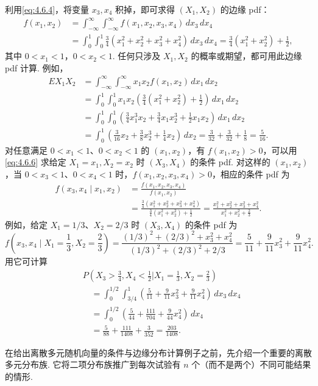 \begin{example}[多元 pdf]
利用\eqref{eq:4.6.4}，将变量 $x_3,x_4$ 积掉，即可求得 $(X_1,X_2)$ 的边缘 pdf：
$$\begin{aligned}
f(x_1,x_2)&=\int_{-\infty}^{\infty}\int_{-\infty}^{\infty}f(x_1,x_2,x_3,x_4)\,dx_3\,dx_4\\
&=\int_0^1\int_0^1\frac34(x_1^2+x_2^2+x_3^2+x_4^2)\,dx_3\,dx_4
=\frac34(x_1^2+x_2^2)+\frac12,
\end{aligned}$$
其中 $0<x_1<1$，$0<x_2<1$. 任何只涉及 $X_1,X_2$ 的概率或期望，都可用此边缘 pdf 计算. 例如，
$$\begin{aligned}
EX_1X_2&=\int_{-\infty}^{\infty}\int_{-\infty}^{\infty}x_1x_2 f(x_1,x_2)\,dx_1\,dx_2\\
&=\int_0^1\int_0^1x_1x_2\left(\frac34(x_1^2+x_2^2)+\frac12\right)\,dx_1\,dx_2\\
&=\int_0^1\int_0^1\left(\frac34x_1^3x_2+\frac34x_1x_2^3+\frac12x_1x_2\right)\,dx_1\,dx_2\\
&=\int_0^1\left(\frac3{16}x_2+\frac38x_2^3+\frac14x_2\right)\,dx_2
=\frac3{32}+\frac3{32}+\frac18=\frac5{16}.
\end{aligned}$$
对任意满足 $0<x_1<1$、$0<x_2<1$ 的 $(x_1,x_2)$，有 $f(x_1,x_2)>0$，可以用\eqref{eq:4.6.6} 求给定 $X_1=x_1,X_2=x_2$ 时 $(X_3,X_4)$ 的条件 pdf. 对这样的 $(x_1,x_2)$，当 $0<x_3<1$、$0<x_4<1$ 时，$f(x_1,x_2,x_3,x_4)>0$，相应的条件 pdf 为
$$\begin{aligned}
f(x_3,x_4\mid x_1,x_2)&=\frac{f(x_1,x_2,x_3,x_4)}{f(x_1,x_2)}\\
&=\frac{\frac34(x_1^2+x_2^2+x_3^2+x_4^2)}{\frac34(x_1^2+x_2^2)+\frac12}
=\frac{x_1^2+x_2^2+x_3^2+x_4^2}{x_1^2+x_2^2+\frac23}.
\end{aligned}$$
例如，给定 $X_1=1/3$、$X_2=2/3$ 时 $(X_3,X_4)$ 的条件 pdf 为
$$f\left(x_3,x_4\mid X_1=\frac13,X_2=\frac23\right)
=\frac{(1/3)^2+(2/3)^2+x_3^2+x_4^2}{(1/3)^2+(2/3)^2+2/3}
=\frac5{11}+\frac9{11}x_3^2+\frac9{11}x_4^2.$$
用它可计算
$$\begin{aligned}
&P\left(X_3>\frac34,X_4<\frac12\mathrel{\Big|}X_1=\frac13,X_2=\frac23\right)\\
&\quad=\int_0^{1/2}\int_{3/4}^1\left(\frac5{11}+\frac9{11}x_3^2+\frac9{11}x_4^2\right)\,dx_3\,dx_4\\
&\quad=\int_0^{1/2}\left(\frac5{44}+\frac{111}{704}+\frac9{44}x_4^2\right)\,dx_4\\
&\quad=\frac5{88}+\frac{111}{1408}+\frac3{352}=\frac{203}{1408}.
\end{aligned}$$
\end{example}
在给出离散多元随机向量的条件与边缘分布计算例子之前，先介绍一个重要的离散多元分布族. 它将二项分布族推广到每次试验有 $n$ 个（而不是两个）不同可能结果的情形.

